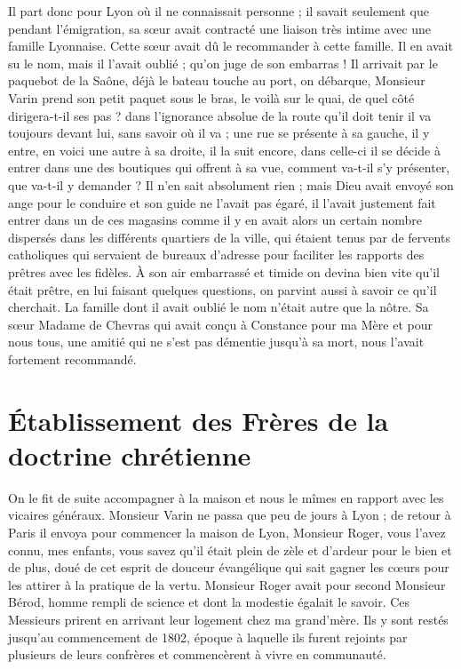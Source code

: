 \documentclass[11pt,a4paper]{report}
\begin{document}
Il part donc pour Lyon où il ne connaissait personne ; il savait seulement que pendant l'émigration, sa sœur avait contracté une liaison très intime avec une famille Lyonnaise. Cette sœur avait dû le recommander à cette famille. Il en avait su le nom, mais il l'avait oublié ; qu'on juge de son embarras ! Il arrivait par le paquebot de la Saône, déjà le bateau touche au port, on débarque, Monsieur Varin prend son petit paquet sous le bras, le voilà sur le quai, de quel côté dirigera-t-il ses pas ? dans l'ignorance absolue de la route qu'il doit tenir il va toujours devant lui, sans savoir où il va ; une rue se présente à sa gauche, il y entre, en voici une autre à sa droite, il la suit encore, dans celle-ci il se décide à entrer dans une des boutiques qui offrent à sa vue, comment va-t-il s'y présenter, que va-t-il y demander ? Il n'en sait absolument rien ; mais Dieu avait envoyé son ange pour le conduire et son guide ne l'avait pas égaré, il l'avait justement fait entrer dans un de ces magasins comme il y en avait alors un certain nombre dispersés dans les différents quartiers de la ville, qui étaient tenus par de fervents catholiques qui servaient de bureaux d'adresse pour faciliter les rapports des prêtres avec les fidèles. À son air embarrassé et timide on devina bien vite qu'il était prêtre, en lui faisant quelques questions, on parvint aussi à savoir ce qu'il cherchait. La famille dont il avait oublié le nom n'était autre que la nôtre. Sa sœur Madame de Chevras qui avait conçu à Constance pour ma Mère et pour nous tous, une amitié qui ne s'est pas démentie jusqu'à sa mort, nous l'avait fortement recommandé.

\section*{Établissement des Frères de la doctrine chrétienne}

On le fit de suite accompagner à la maison et nous le mîmes en rapport avec les vicaires généraux. Monsieur Varin ne passa que peu de jours à Lyon ; de retour à Paris il envoya pour commencer la maison de Lyon, Monsieur Roger, vous l'avez connu, mes enfants, vous savez qu'il était plein de zèle et d'ardeur pour le bien et de plus, doué de cet esprit de douceur évangélique qui sait gagner les cœurs pour les attirer à la pratique de la vertu. Monsieur Roger avait pour second Monsieur Bérod, homme rempli de science et dont la modestie égalait le savoir. Ces Messieurs prirent en arrivant leur logement chez ma grand'mère. Ils y sont restés jusqu'au commencement de 1802, époque à laquelle ils furent rejoints par plusieurs de leurs confrères et commencèrent à vivre en communauté.
\end{document}
